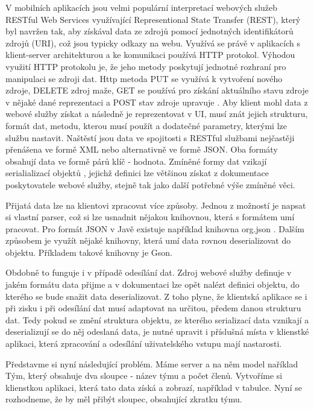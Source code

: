 V mobilních aplikacích jsou velmi populární interpretací webových služeb RESTful Web Services využívající Representional State Transfer (REST), který byl navržen tak, aby získával data ze zdrojů pomocí jednotných identifikátorů zdrojů (URI), což jsou typicky odkazy na webu. Využívá se právě v aplikacích s klient-server architekturou a ke komunikaci používá HTTP protokol. Výhodou využití HTTP protokolu je, že jeho metody poskytují jednotné rozhraní pro manipulaci se zdroji dat. Http metoda PUT se využívá k vytvoření nového zdroje, DELETE zdroj maže, GET se používá pro získání aktuálního stavu zdroje v nějaké dané reprezentaci a POST stav zdroje upravuje \cite{oracle-ws}. Aby klient mohl data z webové služby získat a následně je reprezentovat v UI, musí znát jejich strukturu, formát dat, metodu, kterou musí použít a dodatečné parametry, kterými lze službu nastavit. Naštěstí jsou data ve spojitosti s RESTful službami nejčastěji přenášena ve formě XML nebo alternativně ve formě JSON\cite{ws-formats}. Oba formáty obsahují data ve formě párů klíč - hodnota. Zmíněné formy dat vzikají serialializací objektů \cite{serialization}, jejichž definici lze většinou získat z dokumentace poskytovatele webové služby, stejně tak jako další potřebné výše zmíněné věci.

Přijatá data lze na klientovi zpracovat více způsoby. Jednou z možností je napsat si vlastní parser, což si lze usnadnit nějakou knihovnou, která s formátem umí pracovat. Pro formát JSON v Javě existuje například knihovna org.json \cite{json}. Dalším způsobem je využít nějaké knihovny, která umí data rovnou deserializovat do objektu. Příkladem takové knihovny je Gson\cite{gson}. 

Obdobně to funguje i v případě odesílání dat. Zdroj webové služby definuje v jakém formátu data přijme a v dokumentaci lze opět nalézt definici objektu, do kterého se bude snažit data deserializovat. Z toho plyne, že klientská aplikace se i při zisku i při odesílání dat musí adaptovat na určitou, předem danou strukturu dat. Tedy pokud se změní struktura objektu, ze kterého serializací data vznikají a deserializují se \cite{serialization} do něj odeslaná data, je nutné upravit i příslušná místa v klienstké aplikaci, která zpracování a odesílání uživatelského vstupu mají nastarosti.  

Představme si nyní následující problém. Máme server a na něm model naříklad Tým, který obsahuje dva sloupce - název týmu a počet členů. Vytvoříme si klienstkou aplikaci, která tato data získá a zobrazí, například v tabulce. Nyní se rozhodneme, že by měl přibýt sloupec, obsahující zkratku týmu. 

